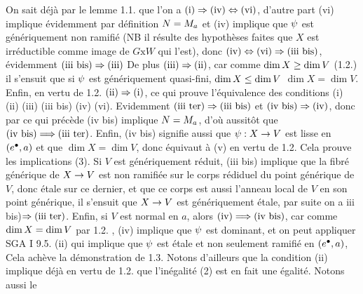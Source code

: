 On sait déjà par le lemme 1.1. que l'on a $\text{(i)}\Rightarrow\text{(iv)}\Leftrightarrow\text{(vi)}$, d'autre part (vi) implique évidemment par définition $N=M_a$ et (iv) implique  que $\psi$ est génériquement non ramifié (NB il résulte des hypothèses faites que $X$ est irréductible comme image de $G\mathrm{x}W$ qui l'est), donc $\text{(iv)}\Leftrightarrow\text{(vi)}\Rightarrow\text{(iii bis)}$, évidemment $\text{(iii bis)}\Rightarrow\text{(iii)}$\unsure{,}  De plus $\text{(iii)}\Rightarrow\text{(ii)}$, car comme $\dim X\geq\dim V$ (1.2.) il s'ensuit que si $\psi$ est génériquement quasi-fini,  $\dim X\leq\dim V$\handwritten{,}  $\dim X=\dim V$. Enfin, en vertu de 1.2.\handwritten{,} $\text{(ii)}\Rightarrow\text{(i)}$, ce qui prouve l'équivalence des conditions (i) (ii) (iii) (iii bis) (iv) (vi). Evidemment $\text{(iii ter)}\Rightarrow\text{(iii bis)}$ et $\text{(iv bis)}\Rightarrow\text{(iv)}$, donc par ce qui précède
(iv bis) implique $N=M_a$, d'où aussitôt que $\text{(iv bis)}\Longrightarrow\text{(iii ter)}$. Enfin, (iv bis) signifie aussi que $\psi:X\to V$ est lisse en $(e^{\bullet},a)$ et que $\dim X=\dim V$, donc équivaut à (v) en vertu de 1.2. Cela prouve les implications (3). Si $V$ est  génériquement réduit\deleted{)},  (iii bis) implique que la fibré générique de $X\to V$ est non ramifiée sur le corps rédiduel du point générique de $V$, donc étale sur ce dernier, et que ce corps est aussi l'anneau local de $V$ en son point générique, il s'ensuit que $X\to V$ est génériquement étale,  par suite on a \handwritten{(}iii bis)$\Rightarrow\text{(iii ter)}$. Enfin, si $V$ est normal en $a$, alors $\text{(iv)}\Longrightarrow\text{(iv bis)}$, car comme $\dim X=\dim V$ par 1.2. , (iv) implique que $\psi$ est dominant, et on peut appliquer SGA I 9.5. (ii) qui implique que $\psi$ est étale et non seulement  ramifié en $(e^{\bullet},a)$,  Cela achève la démonstration de 1.3. Notons d'ailleurs que la condition (ii) implique déjà en vertu de 1.2. que l'inégalité (2) est en fait une égalité. Notons aussi le

